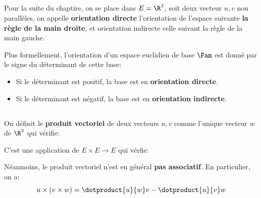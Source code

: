 \subsection*{}
Pour la suite du chaptire, on se place dans \(E = \R^3\), soit deux vecteur \(u, v\) non parallèles, on appelle \textbf{orientation directe} l'orientation de l'espace suivante \textbf{la règle de la main droite}, et orientation indirecte celle suivant la règle de la main gauche.\<

Plus formellement, l'orientation d'un espace euclidien de base \(\Fam\) est donné par le signe du déterminant de cette base:
\begin{itemize}
   \item Si le déterminant est positif, la base est en \textbf{orientation directe}.
   \item Si le déterminant est négatif, la base est en \textbf{orientation indirecte}.
\end{itemize}
\pagebreak

\subsection*{}
On définit le \textbf{produit vectoriel} de deux vecteurs \(u, v\) comme l'unique vecteur \(w\) de \(\R^3\) qui vérifie:

C'est une application de \(E \times E \longrightarrow E\) qui vérfie:

Néanmoins, le produit vectoriel n'est en général \textbf{pas associatif}. En particulier, on a:
\[
    u \times (v \times w) = \dotproduct{u}{w}v - \dotproduct{u}{v}w
\]

